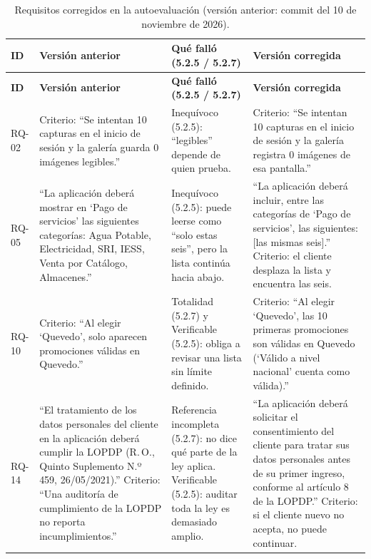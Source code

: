 \documentclass[11pt,a4paper]{article}
\begin{document}
{\footnotesize
\setlength{\tabcolsep}{3pt}
\begin{longtable}{|>{\raggedright\arraybackslash}p{0.95cm}|>{\raggedright\arraybackslash}p{5.0cm}|>{\raggedright\arraybackslash}p{4.0cm}|>{\raggedright\arraybackslash}p{5.4cm}|}
\caption{Requisitos corregidos en la autoevaluación (versión anterior: commit del 10 de noviembre de 2026).}\label{tab:autoevaluacion}\\
\hline
\textbf{ID} & \textbf{Versión anterior} & \textbf{Qué falló (5.2.5 / 5.2.7)} & \textbf{Versión corregida} \\ \hline
\endfirsthead
\hline
\textbf{ID} & \textbf{Versión anterior} & \textbf{Qué falló (5.2.5 / 5.2.7)} & \textbf{Versión corregida} \\ \hline
\endhead
RQ-02 & Criterio: “Se intentan 10 capturas en el inicio de sesión y la galería guarda 0 imágenes legibles.” & Inequívoco (5.2.5): “legibles” depende de quien prueba. & Criterio: “Se intentan 10 capturas en el inicio de sesión y la galería registra 0 imágenes de esa pantalla.” \\ \hline
RQ-05 & “La aplicación deberá mostrar en ‘Pago de servicios’ las siguientes categorías: Agua Potable, Electricidad, SRI, IESS, Venta por Catálogo, Almacenes.” & Inequívoco (5.2.5): puede leerse como “solo estas seis”, pero la lista continúa hacia abajo. & “La aplicación deberá incluir, entre las categorías de ‘Pago de servicios’, las siguientes: [las mismas seis].” Criterio: el cliente desplaza la lista y encuentra las seis. \\ \hline
RQ-10 & Criterio: “Al elegir ‘Quevedo’, solo aparecen promociones válidas en Quevedo.” & Totalidad (5.2.7) y Verificable (5.2.5): obliga a revisar una lista sin límite definido. & Criterio: “Al elegir ‘Quevedo’, las 10 primeras promociones son válidas en Quevedo (‘Válido a nivel nacional’ cuenta como válida).” \\ \hline
RQ-14 & “El tratamiento de los datos personales del cliente en la aplicación deberá cumplir la LOPDP (R.\,O., Quinto Suplemento N.º 459, 26/05/2021).” Criterio: “Una auditoría de cumplimiento de la LOPDP no reporta incumplimientos.” & Referencia incompleta (5.2.7): no dice qué parte de la ley aplica. Verificable (5.2.5): auditar toda la ley es demasiado amplio. & “La aplicación deberá solicitar el consentimiento del cliente para tratar sus datos personales antes de su primer ingreso, conforme al artículo 8 de la LOPDP.” Criterio: si el cliente nuevo no acepta, no puede continuar. \\ \hline
\end{longtable}
}
\end{document}
